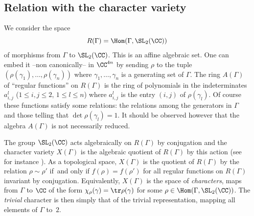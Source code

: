 \subsection{Relation with the character variety}\label{introcarac}

We consider the space
\[ R(\Gamma) = \Hom(\Gamma,\SL_2(\CC)) \]
of morphisms from $\Gamma$ to $\SL_2(\CC)$. This is an affine algebraic set.
One can embed it --non canonically-- in $\CC^{4n}$ by sending $\rho$ to the
tuple $(\rho(\gamma_1),\ldots,\rho(\gamma_n))$ where
$\gamma_1,\ldots,\gamma_n$ is a generating set of $\Gamma$.
The ring $A(\Gamma)$ of ``regular functions'' on $R(\Gamma)$ is the ring of
polynomials in the indeterminates $a_{i,j}^l$
($1\leq i,j\leq 2$, $1\leq l\leq n$)
where $a_{i,j}^l$ is the entry $(i,j)$ of $\rho(\gamma_l)$. Of course
these functions satisfy some relations: the relations among the generators
in $\Gamma$ and those telling that $\det \rho(\gamma_l)=1$.
It should be observed however that
the algebra $A(\Gamma)$ is not necessarily reduced.

The group $\SL_2(\CC)$ acts algebraically on $R(\Gamma)$ by conjugation and
the character variety $X(\Gamma)$ is the algebraic quotient of $R(\Gamma)$ by
this action (see for instance \cite[\S5.1]{Mukai}).
As a topological space, $X(\Gamma)$ is the quotient of
$R(\Gamma)$ by the relation $\rho\sim\rho'$ if~and only if
$f(\rho)=f(\rho')$ for all regular functions on $R(\Gamma)$ invariant
by conjugation.
Equivalently, $X(\Gamma)$ is the space of
{\em characters}, \ie 
maps from $\Gamma$ to $\CC$ of the form $\chi_\rho(\gamma)=\tr \rho(\gamma)$
for some $\rho\in \Hom(\Gamma,\SL_2(\CC))$.
The {\em trivial} character is then simply that of the trivial representation,
mapping all elements of $\Gamma$ to~$2$.

